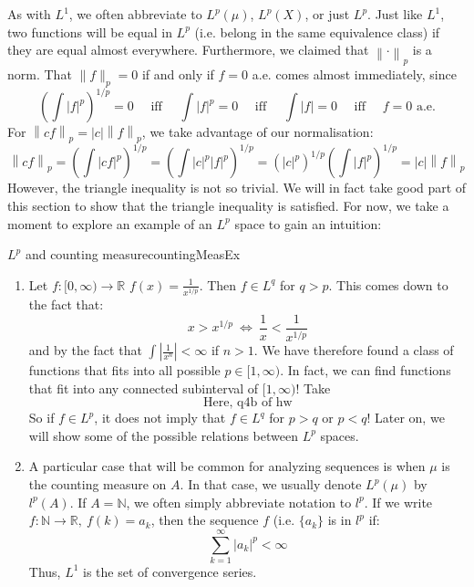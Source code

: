 \documentclass[oneside]{book}
\newcommand{\N}{\mathbb{N}}
\newcommand{\R}{\mathbb{R}}
\newcommand{\rw}{\rightarrow}
\newcommand{\LRw}{\Leftrightarrow}
\begin{document}
As with $L^1$, we often abbreviate to $L^p(\mu)$, $L^p(X)$, or just $L^p$. Just like $L^1$, two functions will be equal
in $L^p$ (i.e. belong in the same equivalence class) if they are equal almost everywhere. Furthermore, we claimed that
$\left\| \cdot \right\|_p$ is a norm. That $\|f \|_p = 0$ if and only if $f = 0$ a.e. comes almost immediately, since
\[
\left(\int |f|^p\right)^{1/p} = 0 \quad \text{ iff }\quad \int |f|^p = 0 \quad\text{ iff }\quad \int
|f| = 0 \quad\text{ iff } \quad f = 0 \text{ a.e.}
\]
For $\left\|cf\right\|_p = |c|\left\| f\right\|_p$, we take advantage of our normalisation:
\[
	\left\| cf\right\|_p = \left(\int |cf|^p\right)^{1/p} = \left(\int |c|^p|f|^p\right)^{1/p}
	= \left(|c|^p\right)^{1/p}\left(\int |f|^p\right)^{1/p} = |c|\left\|f\right\|_p
\]
However, the triangle inequality is not so trivial. We will in fact take good part of this section to show that the
triangle inequality is satisfied. For now, we take a moment to explore an example of an $L^p$ space to gain an
intuition:

\begin{example}{$L^p$ and counting measure}{countingMeasEx}
	\begin{enumerate}
		\item Let $f: [0, \infty) \rw \R$ $f(x) = \frac{1}{x^{1/p}}$. Then $f \in L^q$ for $q > p$. This comes down to the fact that:
			\[
				x > x^{1/p}\ \LRw\ \frac{1}{x} < \frac{1}{x^{1/p}}
			\]
			and by the fact that $\int\left|\frac{1}{x^n}\right| < \infty$ if $n > 1$. We have therefore found a class
			of functions that fits into all possible $p \in [1, \infty)$. In fact, we can find functions that fit into
			any connected subinterval of $[1, \infty)$! Take 
			\[
				\text{Here, q4b of hw}
			\]
			So if $f \in L^p$, it does not imply that $f \in L^q$ for $p > q$ or $p < q$! Later on, we will show some of
			the possible relations between $L^p$ spaces. 
		\item A particular case that will be common for analyzing sequences is when $\mu$ is the counting measure on $A$.
			In that case, we usually denote $L^p(\mu)$ by $l^p(A)$. If $A = \N$, we often simply abbreviate notation to $l^p$.
			If we write $f: \N \rw \R,\ f(k) = a_k$, then the sequence $f$ (i.e. $\{a_k\}$ is in $l^p$ if:
			\[
				\sum_{k=1}^\infty |a_k|^p < \infty
			\]
			Thus, $L^1$ is the set of convergence series. 
	\end{enumerate}
\end{example}
\end{document}
